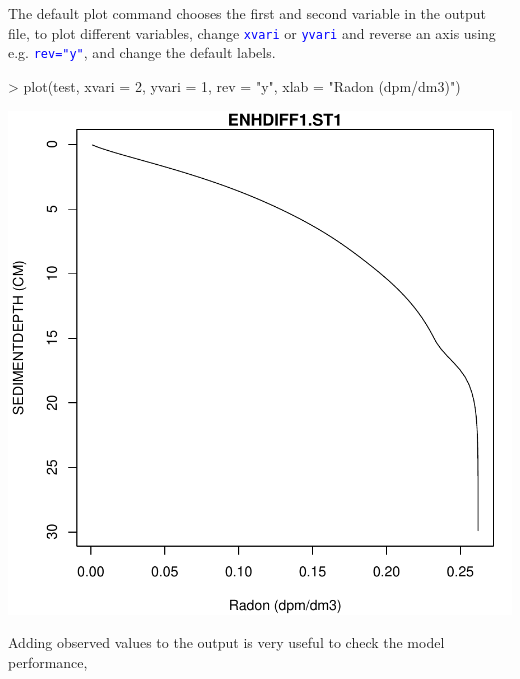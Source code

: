\documentclass{scrartcl}
\newcommand{\Rcode}[1]{\texttt{\textcolor{blue}{#1}}}
\begin{document}
The default plot command chooses the first and second variable in the
output file, to plot different variables, change \Rcode{xvari} or
\Rcode{yvari} and reverse an axis using e.g. \Rcode{rev="y"}, and
change the default labels. 

\begin{Schunk}
\begin{Sinput}
> plot(test, xvari = 2, yvari = 1, rev = "y", xlab = "Radon (dpm/dm3)")
\end{Sinput}
\end{Schunk}
\includegraphics{figures/f-003}

Adding observed values to the output is very useful to check the model
performance,
\end{document}
